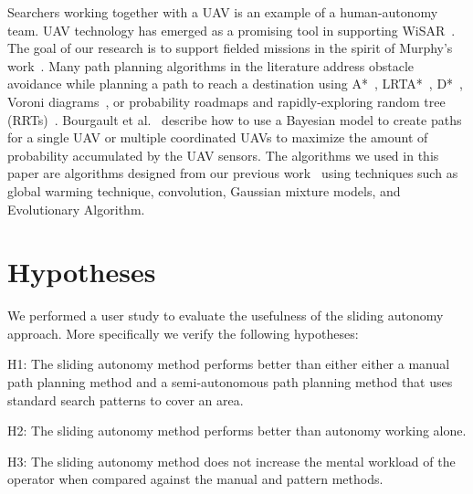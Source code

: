 Searchers working together with a UAV is an example of a human-autonomy team. UAV technology has emerged as a promising tool in supporting WiSAR~\cite{Murphy2008Cooperative,Bourgault2003Coordinated}. The goal of our research is to support fielded missions in the spirit of Murphy's work~\cite{Casper2003Human}. Many path planning algorithms in the literature address obstacle avoidance while planning a path to reach a destination using A*~\cite{Quigley2005Towards}, LRTA*~\cite{Howlett2006Learning}, D*~\cite{Stentz1997Optimal}, Voroni diagrams~\cite{Bortoff2000Path,Beard2005Autonomous}, or probability roadmaps and rapidly-exploring random tree (RRTs)~\cite{Pettersson2006Probabilistic}. 
Bourgault et al.\ \cite{Bourgault2004Coordinated,Bourgault2006Optimal} describe how to use a Bayesian model to create paths for a single UAV or multiple coordinated UAVs to maximize the amount of probability accumulated by the UAV sensors. The algorithms we used in this paper are algorithms designed from our previous work~\cite{Lin2009UAV,Lin2014Hierarchical} using techniques such as global warming technique, convolution, Gaussian mixture models, and Evolutionary Algorithm.

\section{Hypotheses} 
\label{sec:Hypotheses}

We performed a user study to evaluate the usefulness of the sliding autonomy approach. More specifically we verify the following hypotheses:

H1: The sliding autonomy method performs better than either either a manual path planning method and a semi-autonomous path planning method that uses standard search patterns to cover an area.

H2: The sliding autonomy method performs better than autonomy working alone.

H3: The sliding autonomy method does not increase the mental workload of the operator when compared against the manual and pattern methods.

